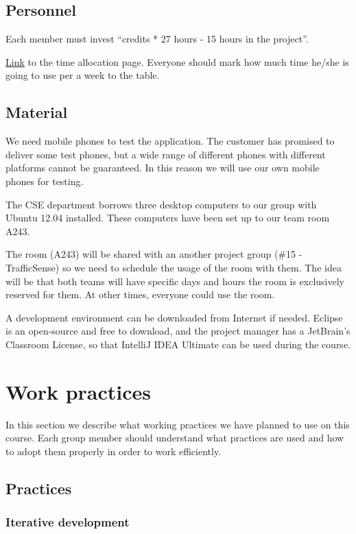 \subsection{Personnel}

Each member must invest ``credits * 27 hours - 15 hours in the project''.

\href{https://docs.google.com/spreadsheet/ccc?key=0Ahu59q_GwtcedHI3MnJQM0NWZS11a
GxFTzFZeVEyQVE&usp=sharing}{Link} to the time allocation page. Everyone should 
mark how much time he/she is going to use per a week to the table.

\subsection{Material}

We need mobile phones to test the application. The customer has promised to 
deliver some test phones, but a wide range of different phones with different 
platforms cannot be guaranteed. In this reason we will use our own mobile phones for testing.

The CSE department borrows three desktop computers 
to our group with Ubuntu 12.04 installed. These computers have been set up 
to our team room A243.

The room (A243) will be shared with an another project group (\#15 - 
TrafficSense) so we need to schedule the usage of the room with them. The idea 
will be that both teams will have specific days and hours the room is 
exclusively reserved for them. At other times, everyone could use the room.

A development environment can be downloaded from Internet if needed. Eclipse is 
an open-source and free to download, and the project manager has a JetBrain's 
Classroom License, so that IntelliJ IDEA Ultimate can be used during the course.

\section{Work practices}

In this section we describe what working practices we have planned to use on this course. Each group member should understand what practices are used and how to adopt them properly in order to work efficiently.

\subsection{Practices}
\subsubsection{Iterative development}

